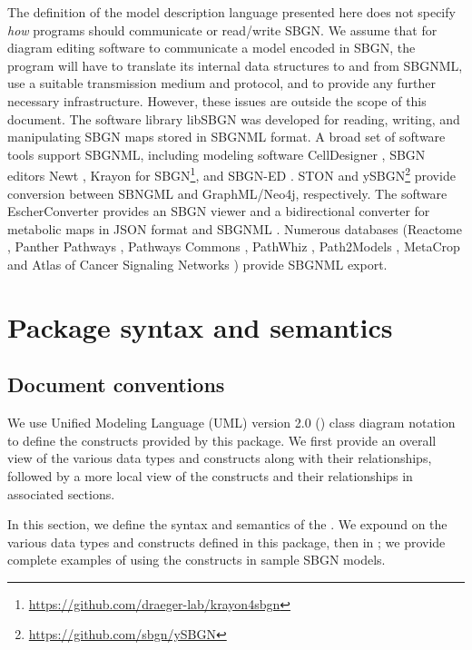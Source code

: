 The definition of the model description language presented here does not specify \emph{how} programs should communicate or read/write SBGN. We assume that for diagram editing software to communicate a model encoded in SBGN, the program will have to translate its internal data structures to and from SBGNML, use a suitable transmission medium and protocol, and to provide any further necessary infrastructure. However, these issues are outside the scope of this document. The software library libSBGN \citep{Iersel2012} was developed for reading, writing, and manipulating SBGN maps stored in SBGNML format. A broad set of software tools support SBGNML, including modeling software CellDesigner \citep{Balaur2020}, SBGN editors Newt \citep{Sari2015}, Krayon for SBGN\footnote{\url{https://github.com/draeger-lab/krayon4sbgn}}, and SBGN-ED \citep{Czauderna2010}. STON \citep{Toure2016} and ySBGN\footnote{\url{https://github.com/sbgn/ySBGN}} provide conversion between SBNGML and GraphML/Neo4j, respectively. The software EscherConverter provides an SBGN viewer and a bidirectional converter for metabolic maps in JSON format and SBGNML \citep{King2015a}. Numerous databases (Reactome \citep{Croft2011}, Panther Pathways \citep{Mi2017}, Pathways Commons \citep{Rodchenkov2020}, PathWhiz \citep{Pon2015}, Path2Models \citep{Buechel2013b}, MetaCrop \citep{Schreiber2012} and Atlas of Cancer Signaling Networks \citep{Kuperstein2015}) provide SBGNML export.

\section{Package syntax and semantics}


\subsection{Document conventions} \label{conventions} 

We use Unified Modeling Language (UML) version 2.0 (\citealt{dennis:2015}) class diagram notation to 
define the constructs provided by this package. We first provide an overall view of the various data types and constructs along with their relationships, followed by a more local view of the constructs and their relationships in associated sections. 

In this section, we define the syntax and semantics of the
\SystemsBiologyGraphicalNotationMarkupLanguagePackage. We expound on the various data types and constructs
defined in this package, then in ; we provide complete
examples of using the constructs in sample SBGN models.

